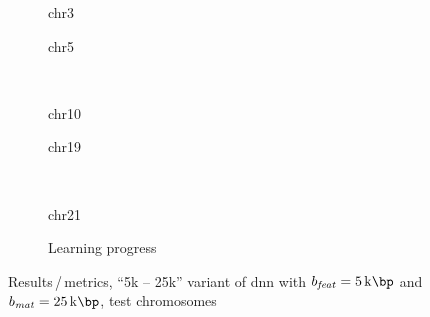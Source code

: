 \begin{figure}[p]%
    \begin{subfigure}{0.45\textwidth}
        \scriptsize
        \caption{chr3}
    \end{subfigure} \hfill
    \begin{subfigure}{0.45\textwidth}
        \scriptsize
        \caption{chr5}
    \end{subfigure}\\[5mm]
    \begin{subfigure}{0.45\textwidth}
        \scriptsize
        \caption{chr10}
    \end{subfigure}\hfill
    \begin{subfigure}{0.45\textwidth}
        \scriptsize
        \caption{chr19}
    \end{subfigure}\\[3mm]
    \centering
    \begin{subfigure}{0.45\textwidth}
        \scriptsize
        \caption{chr21}
    \end{subfigure}\hfill
    \begin{subfigure}{0.45\textwidth}
        \caption{Learning progress} \label{fig:results:25k5DNN_lossEpochs}
    \end{subfigure}
    \caption{Results\,/\,metrics, ``5k -- 25k'' variant of \acrshort{dnn} with $b_\mathit{feat}=\SI{5}{\kilo\bp}$ and $b_\mathit{mat}=\SI{25}{\kilo\bp}$,  test chromosomes}
    \label{fig:results:25k5DNN_pearson}
\end{figure}
